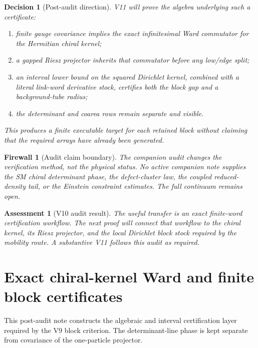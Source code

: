 \documentclass[11pt]{article}
\newtheorem{assessment}[theorem]{Assessment}
\newtheorem{firewall}[theorem]{Firewall}
\newtheorem{decision}[theorem]{Decision}
\begin{document}
\begin{decision}[Post-audit direction]
\label{dec:v11v10-direction}
V11 will prove the algebra underlying such a certificate:
\begin{enumerate}[label=\textnormal{(\alph*)}]
\item finite gauge covariance implies the exact infinitesimal Ward
commutator for the Hermitian chiral kernel;
\item a gapped Riesz projector inherits that commutator before any
low/edge split;
\item an interval lower bound on the squared Dirichlet kernel, combined
with a literal link-word derivative stock, certifies both the block gap
and a background-tube radius;
\item the determinant and coarea rows remain separate and visible.
\end{enumerate}
This produces a finite executable target for each retained block without
claiming that the required arrays have already been generated.
\end{decision}

\begin{firewall}[Audit claim boundary]
\label{fw:v11v10-boundary}
The companion audit changes the verification method, not the physical
status.  No active companion note supplies the SM chiral determinant
phase, the defect-cluster law, the coupled reduced-density tail, or the
Einstein constraint estimates.  The full continuum remains open.
\end{firewall}

\begin{assessment}[V10 audit result]
\label{ass:v11v10}
The useful transfer is an exact finite-word certification workflow.
The next proof will connect that workflow to the chiral kernel, its Riesz
projector, and the local Dirichlet block stock required by the mobility
route.  A substantive V11 follows this audit as required.
\end{assessment}


\section{Exact chiral-kernel Ward and finite block certificates}
\label{sec:v11v11}

This post-audit note constructs the algebraic and interval certification
layer required by the V9 block criterion.  The determinant-line phase is
kept separate from covariance of the one-particle projector.
\end{document}
